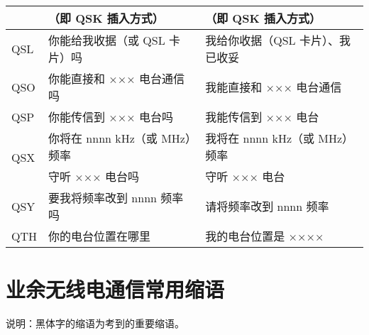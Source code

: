 \begin{longtable}{|l|l|l|}
                         & （即 QSK 插入方式）                      & （即 QSK 插入方式）                      \\
  \hline
  QSL                    & 你能给我收据（或 QSL 卡片）吗                 & 我给你收据（QSL 卡片）、我已收妥                \\
  \hline
  QSO                    & 你能直接和 ××× 电台通信吗                   & 我能直接和 ××× 电台通信                    \\
  \hline
  QSP                    & 你能传信到 ××× 电台吗                     & 我能传信到 ××× 电台                      \\
  \hline
  \multirow{2}{1em}{QSX} & 你将在 nnnn \si{\kHz}（或 \si{\MHz}）频率 & 我将在 nnnn \si{\kHz}（或 \si{\MHz}）频率 \\
                         & 守听 ××× 电台吗                        & 守听 ××× 电台                         \\
  \hline
  QSY                    & 要我将频率改到 nnnn 频率吗                  & 请将频率改到 nnnn 频率                    \\
  \hline
  QTH                    & 你的电台位置在哪里                         & 我的电台位置是 ××××                      \\
  \hline
\end{longtable}

\newpage

\section{业余无线电通信常用缩语}

说明：黑体字的缩语为考到的重要缩语。

